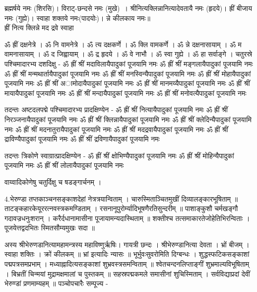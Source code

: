 ब्रह्मर्षये नमः (शिरसि)। विराट्-छन्दसे नमः (मुखे)~। श्रीनित्यक्लिन्नानित्यादेवतायै नमः (हृदये)। ह्रीं बीजाय नमः (गुह्ये)। स्वाहा शक्तये नमः(पादयोः)।
न्ने कीलकाय नमः॥\\
ह्रीं नित्य क्लिन्ने मद द्रवे स्वाहा 


ॐ ह्रीं दक्षनेत्रे । ॐ नि वामनेत्रे । ॐ त्य दक्षकर्णे । ॐ क्लि वामकर्णे । ॐ न्ने दक्षनासायाम् । ॐ म वामनासायाम् । ॐ द जिह्वायाम् । ॐ द्र हृदये । ॐ वे नाभौ । ॐ स्वा गुह्ये । ॐ हा सर्वाङ्गे ।
चतुरस्रे पश्चिमादारभ्य दशदिक्षु -
ॐ ह्रीं श्रीं मदाविलायैपादुकां पूजयामि नमः
ॐ ह्रीं श्रीं मङ्गलायैपादुकां पूजयामि नमः
ॐ ह्रीं श्रीं मन्मथार्तायैपादुकां पूजयामि नमः
ॐ ह्रीं श्रीं मनस्विन्यैपादुकां पूजयामि नमः
ॐ ह्रीं श्रीं मोहायैपादुकां पूजयामि नमः
ॐ ह्रीं श्रीं अामोदायैपादुकां पूजयामि नमः
ॐ ह्रीं श्रीं मानमय्यैपादुकां पूजयामि नमः
ॐ ह्रीं श्रीं मायायैपादुकां पूजयामि नमः
ॐ ह्रीं श्रीं मन्दायैपादुकां पूजयामि नमः
ॐ ह्रीं श्रीं मनोवत्यैपादुकां पूजयामि नमः

तदन्तः अष्टदलपद्मे पश्चिमादारभ्य प्रादक्षिण्येन -
ॐ ह्रीं श्रीं नित्यायैपादुकां पूजयामि नमः
ॐ ह्रीं श्रीं निरञ्जनायैपादुकां पूजयामि नमः
ॐ ह्रीं श्रीं क्लिन्नायैपादुकां पूजयामि नमः
ॐ ह्रीं श्रीं क्लेदिन्यैपादुकां पूजयामि नमः
ॐ ह्रीं श्रीं मदनातुरायैपादुकां पूजयामि नमः
ॐ ह्रीं श्रीं मदद्रवायैपादुकां पूजयामि नमः
ॐ ह्रीं श्रीं द्राविण्यैपादुकां पूजयामि नमः
ॐ ह्रीं श्रीं द्रविणायैपादुकां पूजयामि नमः

तदन्तः त्रिकोणे स्वाग्रात्प्रादक्षिण्येन -
ॐ ह्रीं श्रीं क्षोभिण्यैपादुकां पूजयामि नमः
ॐ ह्रीं श्रीं मोहिन्यैपादुकां पूजयामि नमः
ॐ ह्रीं श्रीं लोलायैपादुकां पूजयामि नमः

वाय्वादिकोणेषु चतुर्दिक्षु च षडङ्गार्चनम् ।

4.भेरुण्डा
तप्तकाञ्चनसङ्काशदेहां नेत्रत्रयान्विताम्  ।
चारुस्मिताञ्चितमुखीं दिव्यालङ्कारभूषिताम्  ॥
ताटङ्कहारकेयूररत्नवस्त्रकमण्डिताम्  ।
रसनानूपुरोर्म्यादिभूषणैरतिसुन्दरीम्  ॥
पाशाङ्कुशौ चर्मखङ्गौ गदावज्रधनुःशरान्  ।
करैर्दधानामासीना पूजायामन्यदास्थिताम् ॥
शक्तीश्च तत्समाकारतेजोहेतिभिरन्विताः ।
पूजयेत्तद्वदभितः स्मितसौम्यमुखः सदा ॥

अस्य श्रीभेरुणडानित्यामहामन्त्रस्य महाविष्णुर्ऋषिः। गायत्री छन्दः । श्रीभेरुण्डानित्या देवता । भ्रों बीजम् । स्वाहा शक्तिः । क्रों कीलकम् ॥
भ्रां इत्यादिः न्यासः ॥
भूर्भुवःसुवरोमिति दिग्बन्धः ।
शुद्धस्फटिकसङ्काशां पद्मपत्रसमप्रभाम् । मध्याह्नादित्यसङ्काशां शुभ्रवस्त्रसमन्विताम् ॥
श्वेतचन्दनलिप्ताङ्गीं शुभ्रमाल्यविभूषिताम् । बिभ्रतीं चिन्मयां मुद्रामक्षमालां च पुस्तकम् ॥
सहस्रपद्मकमले समासीनां शुचिस्मिताम् । सर्वविद्याप्रदां देवीं भेरुण्डां प्रणमाम्यहम् ॥
पञ्चोपचारैः सम्पूज्य -

